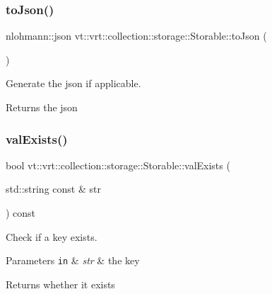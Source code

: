 \subsubsection{\texorpdfstring{to\+Json()}{toJson()}}
{\footnotesize\ttfamily nlohmann\+::json vt\+::vrt\+::collection\+::storage\+::\+Storable\+::to\+Json (\begin{DoxyParamCaption}{ }\end{DoxyParamCaption})}



Generate the json if applicable. 

\begin{DoxyReturn}{Returns}
the json 
\end{DoxyReturn}
\mbox{\label{structvt_1_1vrt_1_1collection_1_1storage_1_1_storable_a46884264a54e5be7fc231208dc468b8e}} 
\subsubsection{\texorpdfstring{val\+Exists()}{valExists()}}
{\footnotesize\ttfamily bool vt\+::vrt\+::collection\+::storage\+::\+Storable\+::val\+Exists (\begin{DoxyParamCaption}\item[{std\+::string const \&}]{str }\end{DoxyParamCaption}) const}



Check if a key exists. 


\begin{DoxyParams}[1]{Parameters}
\mbox{\tt in}  & {\em str} & the key\\
\hline
\end{DoxyParams}
\begin{DoxyReturn}{Returns}
whether it exists 
\end{DoxyReturn}
\mbox{\label{structvt_1_1vrt_1_1collection_1_1storage_1_1_storable_a81a60463dff73c6375422344c8eb410c}} 
